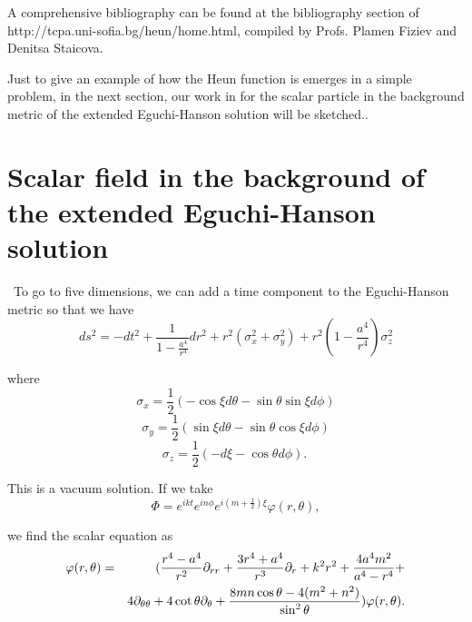 \documentclass{article}
\begin{document}
\noindent A comprehensive bibliography can be found at the
bibliography section of http://tcpa.uni-sofia.bg/heun/home.html,
compiled by Profs. Plamen Fiziev and Denitsa Staicova.



\noindent Just to give an example of how the Heun function is
emerges in a simple problem, in the next section, our work in
\cite{tolga2}  for the scalar particle in the background metric of
the extended Eguchi-Hanson solution will be sketched..

\section{Scalar field in the background of the extended
Eguchi-Hanson solution}

\noindent\ To go to five dimensions, we can add a time component
to the Eguchi-Hanson \cite{Eguchi} metric so that we have
\begin{equation}
ds^{2}=-dt^{2}+{\frac{{1}}{{1-{\frac{{a^{4}}}{{r^{4}}}}}}}%
dr^{2}+r^{2}(\sigma _{x}^{2}+\sigma _{y}^{2})+r^{2}(1-{\frac{{a^{4}}}{{r^{4}}%
}})\sigma _{z}^{2}
\end{equation}%


\noindent where
\begin{equation}
\sigma _{x}={\frac{{1}}{{2}}}(-\cos \xi d\theta -\sin \theta \sin
\xi d\phi )
\end{equation}%
\begin{equation}
\sigma _{y}={\frac{{1}}{{2}}}(\sin \xi d\theta -\sin \theta \cos
\xi d\phi )
\end{equation}%
\begin{equation}
\sigma _{z}={\frac{{1}}{{2}}}(-d\xi -\cos \theta d\phi ).~
\end{equation}%


\noindent This is a vacuum solution. If we take
\begin{equation}
\Phi =e^{ikt}e^{in\phi }e^{i(m+{\frac{{1}}{{2}}})\xi }\varphi
(r,\theta ),
\end{equation}%


\noindent we find the scalar equation as
\begin{eqnarray}
\varphi (r,\theta ) &=&({\frac{{r^{4}-a^{4}}}{{r^{2}}}}\partial _{rr}+{%
\frac{{3r^{4}+a^{4}}}{{r^{3}}}}\partial _{r}+k^{2}r^{2}+{\frac{{4a^{4}m^{2}}%
}{{a^{4}-r^{4}}}}+ \notag \\
&&4\partial _{\theta \theta }+4\cot \theta \partial _{\theta }+{\frac{{%
8mn\cos \theta -4(m^{2}+n^{2})}}{{\sin ^{2}\theta }})}\varphi
(r,\theta ).
\end{eqnarray}
\end{document}
